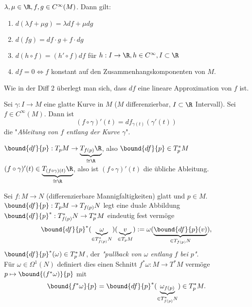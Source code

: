 \lecture
\begin{rem*}
	$ \lambda,\mu \in \R, f,g \in C^\infty(M) $. Dann gilt:
	\begin{enumerate}[label={\roman*})]
		\item $ d(\lambda f + \mu g)= \lambda df + \mu dg $
		\item $ d(fg) = df \cdot g + f \cdot dg $
		\item $ d(h \circ f) = (h' \circ f)df $ für $ h: I \to \R, h \in C^\infty, I \subset \R $
		\item $ df=0 \iff f $ konstant auf den Zusammenhangskomponenten von $M$.
	\end{enumerate}
\end{rem*}

\begin{rem*}
	Wie in der Diff 2 überlegt man sich, dass $df$ eine lineare Approximation von $f$ ist.
\end{rem*}

\begin{defn}
	Sei $ \gamma: I \to M $ eine glatte Kurve in $M$ ($M$ differenzierbar, $I \subset \R$ Intervall). Sei $f \in C^\infty(M)$. Dann ist
	\[ (f \circ \gamma)'(t) = df_{\gamma(t)}(\gamma'(t)) \]
	die "\emph{Ableitung von $f$ entlang der Kurve $\gamma$}".
\end{defn}

\begin{rem*}
	$ \bound{df}{p}: T_pM \to \underbrace{T_{f(p)}\R}_{\cong \R} $, also $ \bound{df}{p} \in T_p^*M $\\
	$ (f \circ \gamma)'(t) \in \underbrace{T_{(f \circ \gamma) (t)}\R}_{\cong \R} $, also ist $(f \circ \gamma)'(t)$ die übliche Ableitung.
\end{rem*}

\begin{defn}[Pullback]
	Sei $ f: M \to N $ (differenzierbare Mannigfaltigkeiten) glatt und $p \in M$. $ \bound{df}{p}: T_pM \to T_{f(p)}N $ legt eine duale Abbildung $ \bound{df}{p}^*: T_{f(p)}^*N \to T_p^*M $ eindeutig fest vermöge
	\[ \bound{df}{p}^*(\underbrace{\omega}_{\in T_{f(p)}^*N})(\underbrace{v}_{\in T_pM}) := \omega(\underbrace{\bound{df}{p}(v)}_{\in T_{f(p)}N}), \]
	$ \bound{df}{p}^* (\omega) \in T_p^*M $, der \emph{"pullback von $\omega$ entlang $f$ bei $p$"}.\\
	Für $\omega \in \Omega^1(N)$ definiert dies einen Schnitt $ f^*\omega: M \to T^*M $ vermöge $ p \mapsto \bound{(f^*\omega)}{p} $ mit
	\[ \bound{f^*\omega}{p} = \bound{df}{p}^* (\underbrace{\omega_{f(p)}}_{\in T_{f(p)}^*N}) \in T_p^*M. \]
\end{defn}

